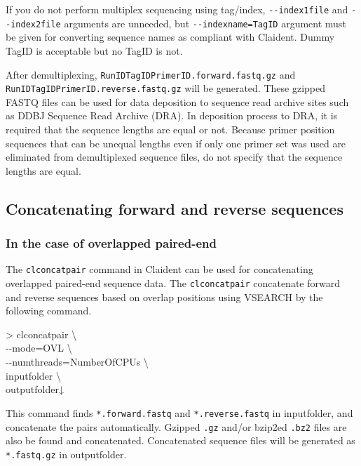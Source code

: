 \documentclass[titlepage,10pt,a4paper,english]{jsbook}
\newenvironment{cmd}{\begin{oframed}\raggedright\ttfamily\footnotesize\setlength{\baselineskip}{1.4em}}{\end{oframed}\vspace{-1em}}
\begin{document}
If you do not perform multiplex sequencing using tag/index, \texttt{{-}{-}index1file} and \texttt{{-}{-}index2file} arguments are unneeded, but \texttt{{-}{-}indexname=TagID} argument must be given for converting sequence names as compliant with Claident.
Dummy TagID is acceptable but no TagID is not.

After demultiplexing, \texttt{RunID{\textunderscore}{\textunderscore}TagID{\textunderscore}{\textunderscore}PrimerID.forward.fastq.gz} and \texttt{RunID{\textunderscore}{\textunderscore}TagID{\textunderscore}{\textunderscore}PrimerID.reverse.fastq.gz} will be generated.
These gzipped FASTQ files can be used for data deposition to sequence read archive sites such as DDBJ Sequence Read Archive (DRA).
In deposition process to DRA, it is required that the sequence lengths are equal or not.
Because primer position sequences that can be unequal lengths even if only one primer set was used are eliminated from demultiplexed sequence files, do not specify that the sequence lengths are equal.

\subsection{Concatenating forward and reverse sequences}\label{subsection:concatenatingpairedend}

\subsubsection{In the case of overlapped paired-end}

The \texttt{clconcatpair} command in Claident can be used for concatenating overlapped paired-end sequence data.
The \texttt{clconcatpair} concatenate forward and reverse sequences based on overlap positions using VSEARCH by the following command.

\begin{cmd}
{\textgreater} clconcatpair {\textbackslash}\\
{-}{-}mode=OVL {\textbackslash}\\
{-}{-}numthreads=NumberOfCPUs {\textbackslash}\\
inputfolder {\textbackslash}\\
outputfolder↓
\end{cmd}

This command finds \texttt{*.forward.fastq} and \texttt{*.reverse.fastq} in inputfolder, and concatenate the pairs automatically.
Gzipped \texttt{.gz} and/or bzip2ed \texttt{.bz2} files are also be found and concatenated.
Concatenated sequence files will be generated as \texttt{*.fastq.gz} in outputfolder.
\end{document}
